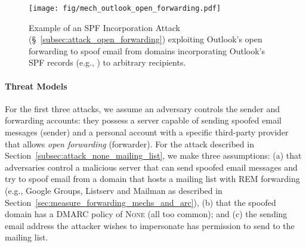 \begin{figure}[t]
  \centerline{\texttt{[image: fig/mech\_outlook\_open\_forwarding.pdf]}}
  \centering
  \caption{Example of an SPF Incorporation Attack (\S~\ref{subsec:attack_open_forwarding}) exploiting Outlook's open forwarding to spoof email from domains incorporating Outlook's SPF records (e.g., ) to arbitrary recipients.}
  \label{fig:open_forwarding_attack_mechanism}
\end{figure}


\paragraph{Threat Models}
For the first three attacks, we assume an adversary controls the
sender and forwarding accounts: they possess a server capable of
sending spoofed email messages (sender) and a personal account with a
specific third-party provider that allows \emph{open forwarding}
(forwarder). For the attack described in
Section~\ref{subsec:attack_none_mailing_list}, we make three
assumptions: (a) that adversaries control a malicious server that can
send spoofed email messages and try to spoof email from a domain that
hosts a mailing list with REM forwarding (e.g., Google Groups,
Listserv and Mailman as described in
Section~\ref{sec:measure_forwarding_mechs_and_arc}), (b) that the spoofed domain
has a DMARC policy of \textsc{None} (all too common); and (c) the
sending email address the attacker wishes to impersonate has
permission to send to the mailing list.






